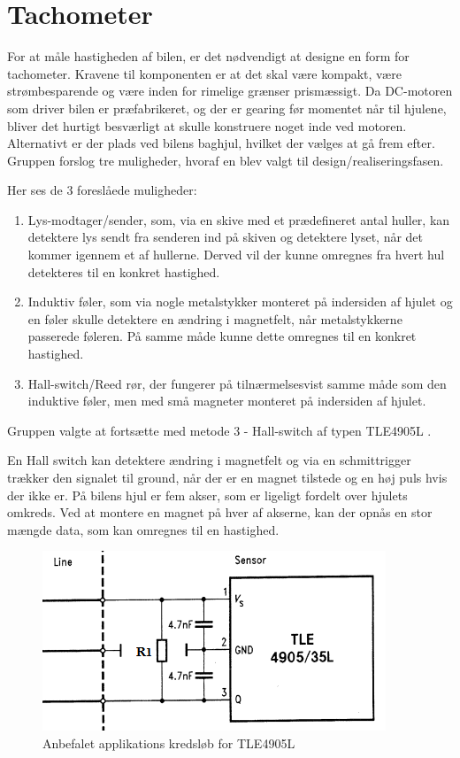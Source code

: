 \section{Tachometer} \label{sub:systemarkitektur_tachometer}

For at måle hastigheden af bilen, er det nødvendigt at designe en form for tachometer. Kravene til komponenten er at det skal være kompakt, være strømbesparende og være inden for rimelige grænser prismæssigt. Da DC-motoren som driver bilen er præfabrikeret, og der er gearing før momentet når til hjulene, bliver det hurtigt besværligt at skulle konstruere noget inde ved motoren. Alternativt er der plads ved bilens baghjul, hvilket der vælges at gå frem efter. Gruppen forslog tre muligheder, hvoraf en blev valgt til design/realiseringsfasen.

Her ses de 3 foreslåede muligheder:

\begin{enumerate}
	\item Lys-modtager/sender, som, via en skive med et prædefineret antal huller, kan detektere lys sendt fra senderen ind på skiven og detektere lyset, når det kommer igennem et af hullerne. Derved vil der kunne omregnes fra hvert hul detekteres til en konkret hastighed.
	\item Induktiv føler, som via nogle metalstykker monteret på indersiden af hjulet og en føler skulle detektere en ændring i magnetfelt, når metalstykkerne passerede føleren. På samme måde kunne dette omregnes til en konkret hastighed.
	\item Hall-switch/Reed rør, der fungerer på tilnærmelsesvist samme måde som den induktive føler, men med små magneter monteret på indersiden af hjulet. 
\end{enumerate}

Gruppen valgte at fortsætte med metode 3 - Hall-switch af typen TLE4905L \cite{lib:TLE4905L}. 

En Hall switch kan detektere ændring i magnetfelt og via en schmittrigger trækker den signalet til ground, når der er en magnet tilstede og en høj puls hvis der ikke er. På bilens hjul er fem akser, som er ligeligt fordelt over hjulets omkreds. Ved at montere en magnet på hver af akserne, kan der opnås en stor mængde data, som kan omregnes til en hastighed. 

\begin{figure}[h]
\centering
\includegraphics[scale=1]{../fig/billeder/tle4905L_application_circuit.png}
\caption{Anbefalet applikations kredsløb for TLE4905L}
\label{fig:tle4905L_app_circuit}
\end{figure}

